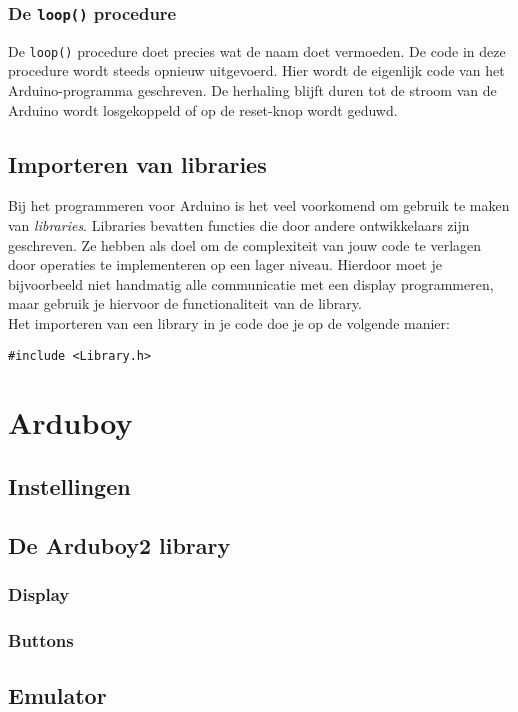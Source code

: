 \documentclass[11pt,fleqn]{book} %
\begin{document}
\subsection{De \texttt{loop()} procedure}
De \texttt{loop()} procedure doet precies wat de naam doet vermoeden. De code in deze procedure wordt steeds opnieuw uitgevoerd. Hier wordt de eigenlijk code van het Arduino-programma geschreven. De herhaling blijft duren tot de stroom van de Arduino wordt losgekoppeld of op de reset-knop wordt geduwd.

\section{Importeren van libraries}
Bij het programmeren voor Arduino is het veel voorkomend om gebruik te maken van \emph{libraries}. Libraries bevatten functies die door andere ontwikkelaars zijn geschreven. Ze hebben als doel om de complexiteit van jouw code te verlagen door operaties te implementeren op een lager niveau. Hierdoor moet je bijvoorbeeld niet handmatig alle communicatie met een display programmeren, maar gebruik je hiervoor de functionaliteit van de library.\\

\noindent
Het importeren van een library in je code doe je op de volgende manier:
\begin{center}
	\texttt{#include <Library.h>}
\end{center}

\chapter{Arduboy}
\section{Instellingen}

\section{De Arduboy2 library}
\subsection{Display}
\subsection{Buttons}

\section{Emulator}
\end{document}
